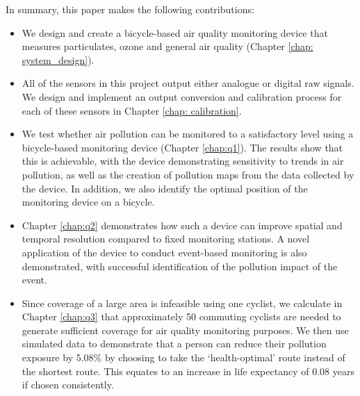 \documentclass[11pt,twosided,a4paper]{report}
\begin{document}



In summary, this paper makes the following contributions:
\begin{itemize}
\item We design and create a bicycle-based air quality monitoring device that measures particulates, ozone and general air quality (Chapter \ref{chap: system_design}).
\item All of the sensors in this project output either analogue or digital raw signals. We design and implement an output conversion and calibration process for each of these sensors in Chapter \ref{chap: calibration}.
\item We test whether air pollution can be monitored to a satisfactory level using a bicycle-based monitoring device (Chapter \ref{chap:q1}). The results show that this is achievable, with the device demonstrating sensitivity to trends in air pollution, as well as the creation of pollution maps from the data collected by the device. In addition, we also identify the optimal position of the monitoring device on a bicycle.
\item Chapter \ref{chap:q2} demonstrates how such a device can improve spatial and temporal resolution compared to fixed monitoring stations. A novel application of the device to conduct event-based monitoring is also demonstrated, with successful identification of the pollution impact of the event.
\item Since coverage of a large area is infeasible using one cyclist, we calculate in Chapter \ref{chap:q3} that approximately 50 commuting cyclists are needed to generate sufficient coverage for air quality monitoring purposes. We then use simulated data to demonstrate that a person can reduce their pollution exposure by 5.08\% by choosing to take the `health-optimal' route instead of the shortest route. This equates to an increase in life expectancy of 0.08 years if chosen consistently.
\end{itemize}
\end{document}

